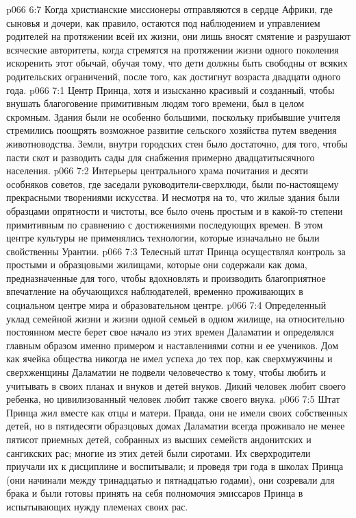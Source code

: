 \vs p066 6:7 Когда христианские миссионеры отправляются в сердце Африки, где сыновья и дочери, как правило, остаются под наблюдением и управлением родителей на протяжении всей их жизни, они лишь вносят смятение и разрушают всяческие авторитеты, когда стремятся на протяжении жизни одного поколения искоренить этот обычай, обучая тому, что дети должны быть свободны от всяких родительских ограничений, после того, как достигнут возраста двадцати одного года.
\vs p066 7:1 Центр Принца, хотя и изысканно красивый и созданный, чтобы внушать благоговение примитивным людям того времени, был в целом скромным. Здания были не особенно большими, поскольку прибывшие учителя стремились поощрять возможное развитие сельского хозяйства путем введения животноводства. Земли, внутри городских стен было достаточно, для того, чтобы пасти скот и разводить сады для снабжения примерно двадцатитысячного населения.
\vs p066 7:2 Интерьеры центрального храма почитания и десяти особняков советов, где заседали руководители\hyp{}сверхлюди, были по\hyp{}настоящему прекрасными творениями искусства. И несмотря на то, что жилые здания были образцами опрятности и чистоты, все было очень простым и в какой\hyp{}то степени примитивным по сравнению с достижениями последующих времен. В этом центре культуры не применялись технологии, которые изначально не были свойственны Урантии.
\vs p066 7:3 Телесный штат Принца осуществлял контроль за простыми и образцовыми жилищами, которые они содержали как дома, предназначенные для того, чтобы вдохновлять и производить благоприятное впечатление на обучающихся наблюдателей, временно проживающих в социальном центре мира и образовательном центре.
\vs p066 7:4 \pc Определенный уклад семейной жизни и жизни одной семьей в одном жилище, на относительно постоянном месте берет свое начало из этих времен Даламатии и определялся главным образом именно примером и наставлениями сотни и ее учеников. Дом как ячейка общества никогда не имел успеха до тех пор, как сверхмужчины и сверхженщины Даламатии не подвели человечество к тому, чтобы любить и учитывать в своих планах и внуков и детей внуков. Дикий человек любит своего ребенка, но цивилизованный человек любит также своего внука.
\vs p066 7:5 Штат Принца жил вместе как отцы и матери. Правда, они не имели своих собственных детей, но в пятидесяти образцовых домах Даламатии всегда проживало не менее пятисот приемных детей, собранных из высших семейств андонитских и сангикских рас; многие из этих детей были сиротами. Их сверхродители приучали их к дисциплине и воспитывали; и проведя три года в школах Принца (они начинали между тринадцатью и пятнадцатью годами), они созревали для брака и были готовы принять на себя полномочия эмиссаров Принца в испытывающих нужду племенах своих рас.
